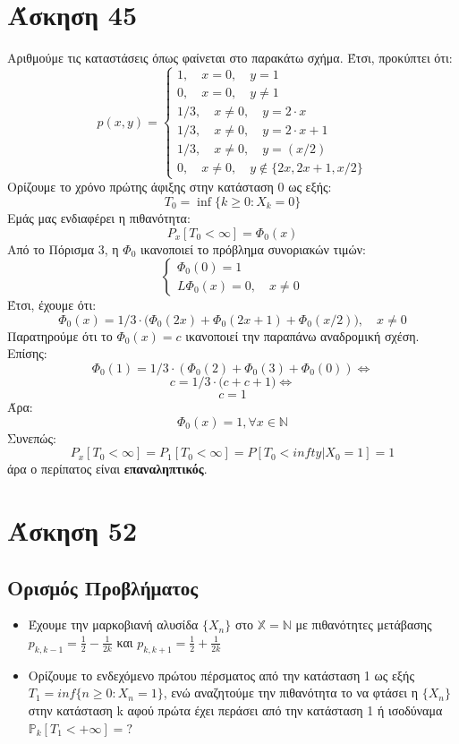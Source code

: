 \documentclass[a4paper,oneside, 11pt]{article}
\begin{document}
\section*{Άσκηση 45}
Αριθμούμε τις καταστάσεις όπως φαίνεται στο παρακάτω σχήμα.
Έτσι, προκύπτει ότι:
$$
p(x, y) = \begin{cases}
1, \quad x = 0, \quad y=1 \\
0, \quad x = 0, \quad y \neq 1 \\
1/3, \quad x \neq 0, \quad y = 2\cdot x \\
1/3, \quad x \neq 0, \quad y= 2\cdot x + 1 \\
1/3, \quad x \neq 0, \quad y = (x/2) \\
0, \quad x \neq 0, \quad y \not \in \{2x, 2x+1, x/2\}
\end{cases}
$$
Ορίζουμε το χρόνο πρώτης άφιξης στην κατάσταση $0$ ως εξής:
$$
T_0 = \inf \{ k\geq 0: X_k = 0\}
$$
Εμάς μας ενδιαφέρει η πιθανότητα:
$$
P_x[T_0 < \infty] = \Phi_0(x)
$$
Από το Πόρισμα 3, η $\Phi_0$ ικανοποιεί το πρόβλημα συνοριακών τιμών:
$$
\begin{cases}
\Phi_0(0) = 1 \\
L\Phi_0(x) = 0, \quad x \neq 0
\end{cases}
$$
Έτσι, έχουμε ότι:
$$
\Phi_0(x) = 1/3 \cdot \big( \Phi_0(2x) + \Phi_0(2x + 1) + \Phi_0(x/2)\big), \quad x \neq 0
$$
Παρατηρούμε ότι το $\Phi_0(x) = c$ ικανοποιεί την παραπάνω αναδρομική σχέση.
Επίσης:
$$
\Phi_0(1) = 1/3 \cdot (\Phi_0(2) + \Phi_0(3) + \Phi_0(0)) \iff
$$
$$
c = 1/3 \cdot \big( c + c + 1 \big) \iff 
$$
$$
c = 1
$$
Άρα:
$$
\Phi_0(x) = 1, \forall x \in \mathbb N
$$
Συνεπώς:
$$
P_x[T_0 < \infty] = P_1[T_0 < \infty] = P[T_0 < infty | X_0 = 1] = 1
$$
άρα ο περίπατος είναι \textbf{επαναληπτικός}.
\section*{Άσκηση 52}
\subsection*{Ορισμός Προβλήματος}
\begingroup
\begin{itemize}
	\item  Έχουμε την μαρκοβιανή αλυσίδα $\{X_n\}$ στο $\mathbb{X = N}$ με πιθανότητες μετάβασης $p_{k,k-1} = \frac{1}{2} - \frac{1}{2k} $ και $p_{k,k+1} = \frac{1}{2} + \frac{1}{2k} $
	\item Ορίζουμε το ενδεχόμενο πρώτου πέρσματος από την κατάσταση 1 ως εξής $T_1 = inf\{n \geq 0: X_n = 1\}$, ενώ αναζητούμε την πιθανότητα το να φτάσει η $\{ X_n\}$ στην κατάσταση k αφού πρώτα έχει περάσει από την κατάσταση 1 ή ισοδύναμα $\mathbb{P}_k[ T_1 < + \infty] = ?$
	
\end{itemize}
\endgroup
\end{document}
